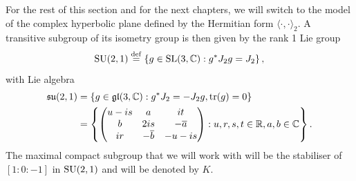 \documentclass{report}
\begin{document}
For the rest of this section and for the next chapters, we will switch to the model of the complex hyperbolic plane defined by the Hermitian form $\langle \cdot, \cdot \rangle_2$. 
A transitive subgroup of its isometry group  is then given by the rank 1 Lie group
\[
\operatorname{{\mathrm{SU}}}(2,1) \overset{\mathrm{def}}{=} \left\{ g \in \operatorname{{\mathrm{SL}}}(3, \mathbb C) : g^* J_2 g = J_2 \right\},
\]
with Lie algebra
\begin{align*}
    \operatorname{{\mathfrak{su}}}(2,1) &= \left\{ g \in \operatorname{{\mathfrak{gl}}}(3, \mathbb C) : g^* J_2 = - J_2 g, \operatorname{tr}(g) = 0 \right\}\\
    &= \left\{ 
        \begin{pmatrix}
            u - is & a & it\\
            b & 2is & -\overline{a}\\
            ir & -\overline{b} & -u - is
        \end{pmatrix} : u,r,s,t \in \mathbb R, a, b \in \mathbb C
    \right\}.
\end{align*}
The maximal compact subgroup that we will work with will be the stabiliser of $[1:0:-1]$ in $\operatorname{{\mathrm{SU}}}(2,1)$ and will be denoted by $K$.
\end{document}
